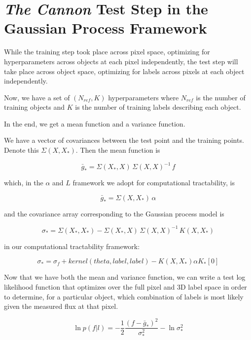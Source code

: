\documentclass[12pt, preprint]{aastex}
\begin{document}
\section{\emph{The Cannon} Test Step in the Gaussian Process Framework}

While the training step took place across pixel space, optimizing for 
hyperparameters across objects at each pixel independently, the test step 
will take place across object space, optimizing for labels across pixels at 
each object independently.

Now, we have a set of $(N_{ref}, K)$ hyperparameters where $N_{ref}$ is 
the number of training objects and $K$ is the number of training labels 
describing each object.


In the end, we get a mean function and a variance function. 

We have a vector of covariances between the test point and the training 
points. Denote this $\Sigma(X,X_*)$. Then the mean function is

\begin{equation}
  \bar{g}_* = \Sigma(X_*, X)\,\Sigma(X, X)^{-1}\,f
  \label{}
\end{equation}

which, in the $\alpha$ and $L$ framework we adopt for computational
tractability, is

\begin{equation}
  \bar{g}_* = \Sigma(X, X_*)\,\alpha
  \label{}
\end{equation}

and the covariance array corresponding to the Gaussian process model is

\begin{equation}
  \sigma_* = \Sigma(X_*, X_*)-\Sigma(X_*,X)\,\Sigma(X,X)^{-1}\,K(X,X_*)
  \label{}
\end{equation}

in our computational tractability framework:

\begin{equation}
  \sigma_* = \sigma_f + kernel(theta, label, label) - K(X,X_*) \alpha K_*[0]
  \label{}
\end{equation}

Now that we have both the mean and variance function, 
we can write a test log likelihood function that optimizes over the full pixel
and 3D label space in order to determine, for a particular object, which 
combination of labels is most likely given the measured flux at that pixel.

\begin{equation}
  \ln{p(f|l)} = -\frac{1}{2} \frac{(f-\bar{g}_*)^2}{\sigma_*^2} - \ln{\sigma_*^2}
  \label{}
\end{equation}
\end{document}
